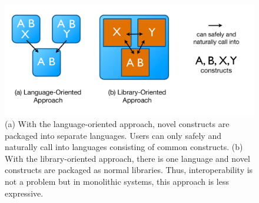 \begin{figure}
\begin{center}
\includegraphics[scale=0.5]{approaches.pdf}
\end{center}
\vspace{-20px}
\caption{\small (a) With the language-oriented approach, novel constructs are packaged into separate languages. Users can only safely and naturally call into languages consisting of common constructs. (b) With the library-oriented approach, there is one language and novel constructs are packaged as normal libraries. Thus, interoperability is not a problem but in monolithic systems, this approach is less expressive.\label{approaches}}
\end{figure}
